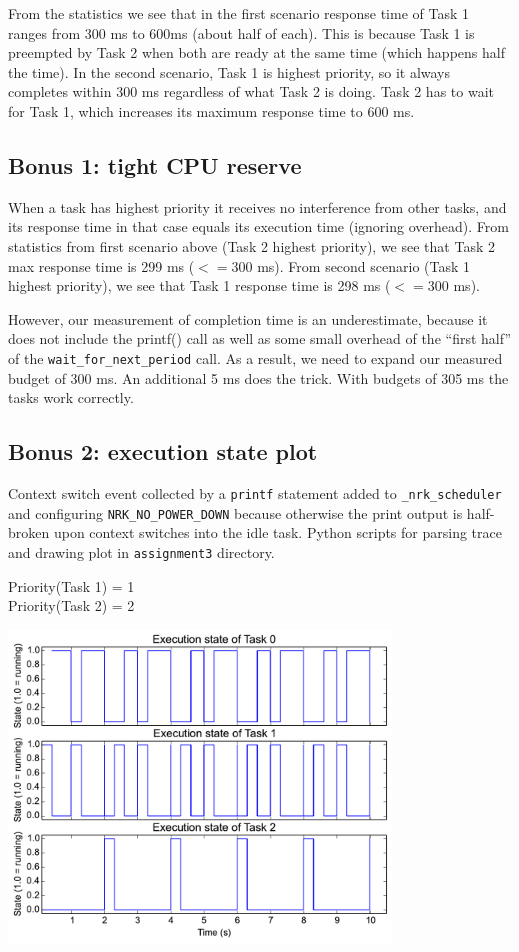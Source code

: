 \documentclass{article}
\begin{document}
From the statistics we see that in the first scenario response time of Task 1
ranges from 300 ms to 600ms (about half of each). This is because Task 1 is
preempted by Task 2 when both are ready at the same time (which happens half
the time). In the second scenario, Task 1 is highest priority, so it always
completes within 300 ms regardless of what Task 2 is doing. Task 2 has to wait
for Task 1, which increases its maximum response time to 600 ms.

\subsection*{Bonus 1: tight CPU reserve}

When a task has highest priority it receives no interference from other tasks,
and its response time in that case equals its execution time (ignoring
overhead).  From statistics from first scenario above (Task 2 highest
priority), we see that Task 2 max response time is 299 ms ($<= 300$ ms). From
second scenario (Task 1 highest priority), we see that Task 1 response time is 
298 ms ($<= 300$ ms).

However, our measurement of completion time is an underestimate, because it
does not include the printf() call as well as some small overhead of the
``first half'' of the \texttt{wait\_for\_next\_period} call. As a result, we
need to expand our measured budget of 300 ms. An additional 5 ms does the
trick. With budgets of 305 ms the tasks work correctly.

\pagebreak

\subsection*{Bonus 2: execution state plot}

Context switch event collected by a \texttt{printf} statement added to
\texttt{\_nrk\_scheduler} and configuring \verb!NRK_NO_POWER_DOWN!  because
otherwise the print output is half-broken upon context switches into the idle
task. Python scripts for parsing trace and drawing plot in \texttt{assignment3}
directory.

\vspace{10pt}

Priority(Task 1) = 1 \\
Priority(Task 2) = 2
\begin{center}
\includegraphics[width=4in]{ctx-switch-trace-orig}
\end{center}
\end{document}
